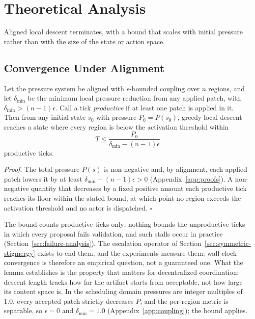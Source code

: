 
\section{Theoretical Analysis}
\label{sec:theoretical-analysis}

Aligned local descent terminates, with a bound that scales with initial pressure rather than with the size of the state or action space.

\subsection{Convergence Under Alignment}

\begin{lemma}
\label{thm:convergence}
Let the pressure system be aligned with $\epsilon$-bounded coupling over $n$ regions, and let $\delta_{\min}$ be the minimum local pressure reduction from any applied patch, with $\delta_{\min} > (n-1)\epsilon$. Call a tick \emph{productive} if at least one patch is applied in it. Then from any initial state $s_0$ with pressure $P_0 = P(s_0)$, greedy local descent reaches a state where every region is below the activation threshold within
\[
T \leq \frac{P_0}{\delta_{\min} - (n-1)\epsilon}
\]
productive ticks.
\end{lemma}

\emph{Proof.} The total pressure $P(s)$ is non-negative and, by alignment, each applied patch lowers it by at least $\delta_{\min} - (n-1)\epsilon > 0$ (Appendix~\ref{app:proofs}). A non-negative quantity that decreases by a fixed positive amount each productive tick reaches its floor within the stated bound, at which point no region exceeds the activation threshold and no actor is dispatched. $\square$

The bound counts productive ticks only; nothing bounds the unproductive ticks in which every proposal fails validation, and such stalls occur in practice (Section~\ref{sec:failure-analysis}). The escalation operator of Section~\ref{sec:symmetric-stigmergy} exists to end them, and the experiments measure them; wall-clock convergence is therefore an empirical question, not a guaranteed one. What the lemma establishes is the property that matters for decentralized coordination: descent length tracks how far the artifact starts from acceptable, not how large its content space is. In the scheduling domain pressures are integer multiples of $1.0$, every accepted patch strictly decreases $P$, and the per-region metric is separable, so $\epsilon = 0$ and $\delta_{\min} = 1.0$ (Appendix~\ref{app:coupling}); the bound applies.

